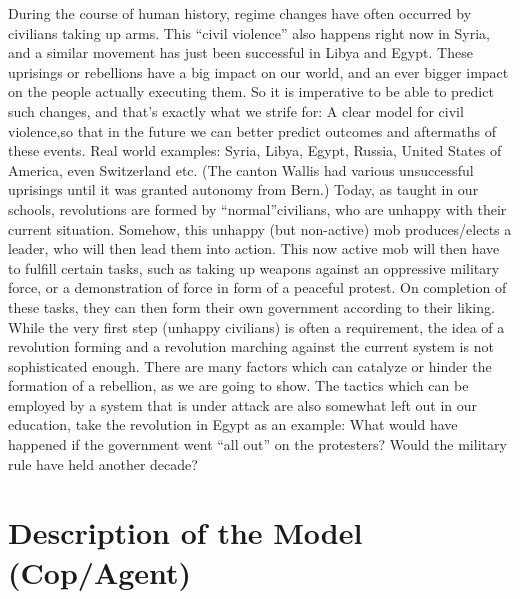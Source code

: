 \documentclass[11pt]{article}
\begin{document}
During the course of human history, regime changes have often occurred by civilians taking up arms. This “civil violence” also happens right now in Syria, and a similar movement has just been successful in Libya and Egypt. These uprisings or rebellions have a big impact on our world, and an ever bigger impact on the people actually executing them. So it is imperative to be able to predict such changes, and that's exactly what we strife for: A clear model for civil violence,so that in the future we can better predict outcomes and aftermaths of these events.\newline\newline
Real world examples: Syria, Libya, Egypt, Russia, United States of America, even Switzerland etc.\newline
(The canton Wallis had various unsuccessful uprisings until it was granted autonomy from Bern.)\newline\newline
Today, as taught in our schools, revolutions are formed by “normal”civilians, who are unhappy with their current situation. Somehow, this unhappy (but non-active) mob produces/elects a leader, who will then lead them into action. This now active mob will then have to fulfill certain tasks, such as taking up weapons against an oppressive military force, or a demonstration of force in form of a peaceful protest. On completion of these tasks, they can then form their own government according to their liking.\newline
While the very first step (unhappy civilians) is often a requirement, the idea of a revolution forming and a revolution marching against the current system is not sophisticated enough. There are many factors which can catalyze or hinder the formation of a rebellion, as we are going to show.\newline\newline
The tactics which can be employed by a system that is under attack are also somewhat left out in our education, take the revolution in Egypt as an example: What would have happened if the government went “all out” on the protesters? Would the military rule have held another decade?

\newpage

\section{Description of the Model (Cop/Agent)}
\end{document}
